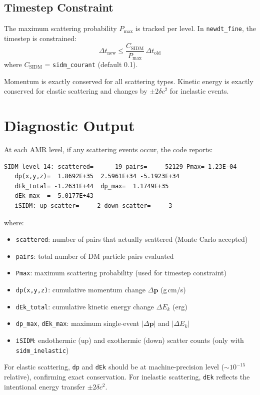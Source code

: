 \documentclass[11pt,fleqn]{book}
\begin{document}
\subsection{Timestep Constraint}

The maximum scattering probability $P_{\max}$ is tracked per level.
In \texttt{newdt\_fine}, the timestep is constrained:
\[
  \Delta t_{\mathrm{new}} \le \frac{C_{\mathrm{SIDM}}}{P_{\max}} \,\Delta t_{\mathrm{old}}
\]
where $C_{\mathrm{SIDM}}$ = \texttt{sidm\_courant} (default 0.1).

Momentum is exactly conserved for all scattering types.
Kinetic energy is exactly conserved for elastic scattering and changes by
$\pm 2\delta c^2$ for inelastic events.

\section{Diagnostic Output}

At each AMR level, if any scattering events occur, the code reports:
\begin{lstlisting}[style=fortran,numbers=none]
 SIDM level 14: scattered=      19 pairs=     52129 Pmax= 1.23E-04
   dp(x,y,z)=  1.8692E+35  2.5961E+34 -5.1923E+34
   dEk_total= -1.2631E+44  dp_max=  1.1749E+35
   dEk_max  =  5.0177E+43
   iSIDM: up-scatter=     2 down-scatter=     3
\end{lstlisting}
where:
\begin{itemize}[nosep]
  \item \texttt{scattered}: number of pairs that actually scattered (Monte Carlo accepted)
  \item \texttt{pairs}: total number of DM particle pairs evaluated
  \item \texttt{Pmax}: maximum scattering probability (used for timestep constraint)
  \item \texttt{dp(x,y,z)}: cumulative momentum change $\Delta\mathbf{p}$ (g\,cm/s)
  \item \texttt{dEk\_total}: cumulative kinetic energy change $\Delta E_k$ (erg)
  \item \texttt{dp\_max}, \texttt{dEk\_max}: maximum single-event $|\Delta\mathbf{p}|$ and $|\Delta E_k|$
  \item \texttt{iSIDM}: endothermic (up) and exothermic (down) scatter counts (only with \texttt{sidm\_inelastic})
\end{itemize}
For elastic scattering, \texttt{dp} and \texttt{dEk} should be at machine-precision level ($\sim 10^{-15}$ relative), confirming exact conservation.
For inelastic scattering, \texttt{dEk} reflects the intentional energy transfer $\pm 2\delta c^2$.
\end{document}
